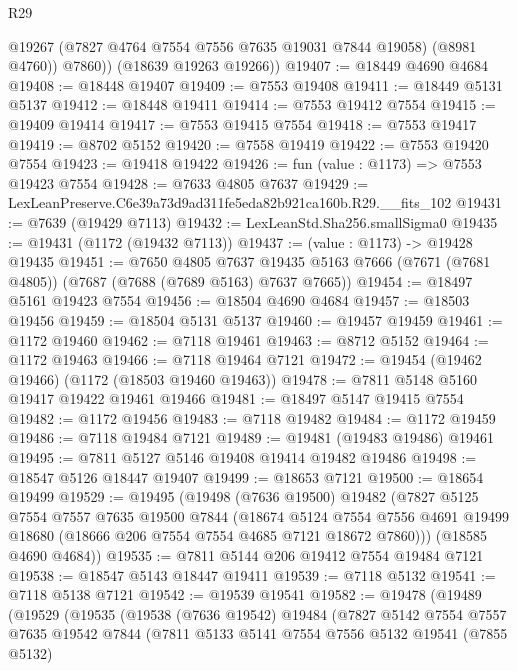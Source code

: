 \begin{lexlean}{R29}
\begin{coremodule}
            @19267
            (@7827 @4764 @7554 @7556 @7635 @19031 @7844 @19058)
            (@8981 @4760))
          @7860))
      (@18639 @19263 @19266))
@19407 := @18449 @4690 @4684
@19408 := @18448 @19407
@19409 := @7553 @19408
@19411 := @18449 @5131 @5137
@19412 := @18448 @19411
@19414 := @7553 @19412 @7554
@19415 := @19409 @19414
@19417 := @7553 @19415 @7554
@19418 := @7553 @19417
@19419 := @8702 @5152
@19420 := @7558 @19419
@19422 := @7553 @19420 @7554
@19423 := @19418 @19422
@19426 := fun (value : @1173) => @7553 @19423 @7554
@19428 := @7633 @4805 @7637
@19429 := LexLeanPreserve.C6e39a73d9ad311fe5eda82b921ca160b.R29.__fits_102
@19431 := @7639 (@19429 @7113)
@19432 := LexLeanStd.Sha256.smallSigma0
@19435 := @19431 (@1172 (@19432 @7113))
@19437 := (value : @1173) -> @19428 @19435
@19451 := @7650
    @4805
    @7637
    @19435
    @5163
    @7666
    (@7671 (@7681 @4805))
    (@7687 (@7688 (@7689 @5163) @7637 @7665))
@19454 := @18497 @5161 @19423 @7554
@19456 := @18504 @4690 @4684
@19457 := @18503 @19456
@19459 := @18504 @5131 @5137
@19460 := @19457 @19459
@19461 := @1172 @19460
@19462 := @7118 @19461
@19463 := @8712 @5152
@19464 := @1172 @19463
@19466 := @7118 @19464 @7121
@19472 := @19454 (@19462 @19466) (@1172 (@18503 @19460 @19463))
@19478 := @7811 @5148 @5160 @19417 @19422 @19461 @19466
@19481 := @18497 @5147 @19415 @7554
@19482 := @1172 @19456
@19483 := @7118 @19482
@19484 := @1172 @19459
@19486 := @7118 @19484 @7121
@19489 := @19481 (@19483 @19486) @19461
@19495 := @7811 @5127 @5146 @19408 @19414 @19482 @19486
@19498 := @18547 @5126 @18447 @19407
@19499 := @18653 @7121
@19500 := @18654 @19499
@19529 := @19495
    (@19498
      (@7636 @19500)
      @19482
      (@7827
        @5125
        @7554
        @7557
        @7635
        @19500
        @7844
        (@18674
          @5124
          @7554
          @7556
          @4691
          @19499
          @18680
          (@18666 @206 @7554 @7554 @4685 @7121 @18672 @7860)))
      (@18585 @4690 @4684))
@19535 := @7811 @5144 @206 @19412 @7554 @19484 @7121
@19538 := @18547 @5143 @18447 @19411
@19539 := @7118 @5132
@19541 := @7118 @5138 @7121
@19542 := @19539 @19541
@19582 := @19478
    (@19489
      (@19529
        (@19535
          (@19538
            (@7636 @19542)
            @19484
            (@7827
              @5142
              @7554
              @7557
              @7635
              @19542
              @7844
              (@7811
                @5133
                @5141
                @7554
                @7556
                @5132
                @19541
                (@7855 @5132)

\end{coremodule}
\end{lexlean}
